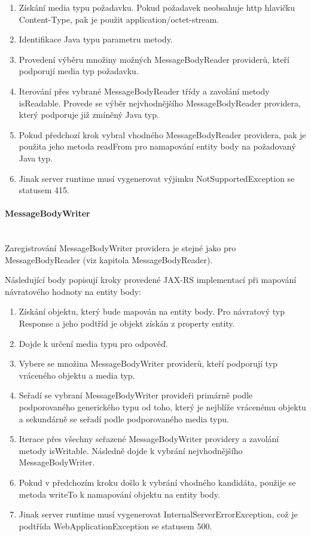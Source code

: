 \documentclass[11pt,twoside,a4paper]{book}
\begin{document}
\begin{enumerate}
  \item Získání media typu požadavku. Pokud požadavek neobsahuje http hlavičku
Content-Type, pak je použit application/octet-stream.
  \item Identifikace Java typu parametru metody.
  \item Provedení výběru množiny možných MessageBodyReader providerů, kteří
podporují media typ požadavku.
  \item Iterování přes vybrané MessageBodyReader třídy a zavolání metody isReadable.
Provede se výběr nejvhodnějšího MessageBodyReader providera, který podporuje
již zmíněný Java typ.
  \item Pokud předchozí krok vybral vhodného MessageBodyReader providera, pak je
použita jeho metoda readFrom pro namapování entity body na požadovaný Java typ.
  \item Jinak server runtime musí vygenerovat výjimku NotSupportedException se
statusem 415.
\end{enumerate}

\paragraph{MessageBodyWriter}
\mbox{}\\

Zaregistrování MessageBodyWriter providera je stejné jako pro MessageBodyReader
(viz kapitola MessageBodyReader).

Následující body popisují kroky provedené JAX-RS implementací při mapování
návratového hodnoty na entity body:

\begin{enumerate}
  \item Získání objektu, který bude mapován na entity body. Pro návratový typ Response a
jeho podtříd je objekt získán z property entity.
  \item Dojde k určení media typu pro odpověď.
  \item Vybere se množina MessageBodyWriter providerů, kteří podporují typ vráceného
objektu a media typ.
  \item Seřadí se vybraní MessageBodyWriter provideři primárně podle podporovaného
generického typu od toho, který je nejblíže vrácenému objektu a sekundárně se seřadí
podle podporovaného media typu.
  \item Iterace přes všechny seřazené MessageBodyWriter providery a zavolání
metody isWritable. Následně dojde k vybrání nejvhodnějšího MessageBodyWriter.
  \item Pokud v předchozím kroku došlo k vybrání vhodného kandidáta, použije se
metoda writeTo k namapování objektu na entity body.
  \item Jinak server runtime musí vygenerovat InternalServerErrorException, což
je podtřída WebApplicationException se statusem 500.
\end{enumerate}
\end{document}

